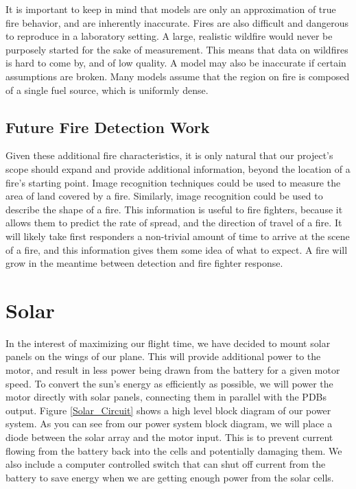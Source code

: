 \documentclass[12pt,journal,compsoc]{IEEEtran}
\begin{document}
It is important to keep in mind that models are only an approximation of true fire behavior, and are inherently inaccurate. Fires are also difficult and dangerous to reproduce in a laboratory setting. A large, realistic wildfire would never be purposely started for the sake of measurement. This means that data on wildfires is hard to come by, and of low quality. A model may also be inaccurate if certain assumptions are broken. Many models assume that the region on fire is composed of a single fuel source, which is uniformly dense.

\subsection{Future Fire Detection Work}
Given these additional fire characteristics, it is only natural that our project's scope should expand and provide additional information, beyond the location of a fire's starting point. Image recognition techniques could be used to measure the area of land covered by a fire. Similarly, image recognition could be used to describe the shape of a fire. This information is useful to fire fighters, because it allows them to predict the rate of spread, and the direction of travel of a fire. It will likely take first responders a non-trivial amount of time to arrive at the scene of a fire, and this information gives them some idea of what to expect. A fire will grow in the meantime between detection and fire fighter response. 

\section{Solar}
In the interest of maximizing our flight time, we have decided to mount solar panels on the wings of our plane. This will provide additional power to the motor, and result in less power being drawn from the battery for a given motor speed. To convert the sun's energy as efficiently as possible, we will power the motor directly with solar panels, connecting them in parallel with the PDBs output. Figure \ref{Solar_Circuit} shows a high level block diagram of our power system. As you can see from our power system block diagram, we will place a diode between the solar array and the motor input. This is to prevent current flowing from the battery back into the cells and potentially damaging them. We also include a computer controlled switch that can shut off current from the battery to save energy when we are getting enough power from the solar cells.
\end{document}
